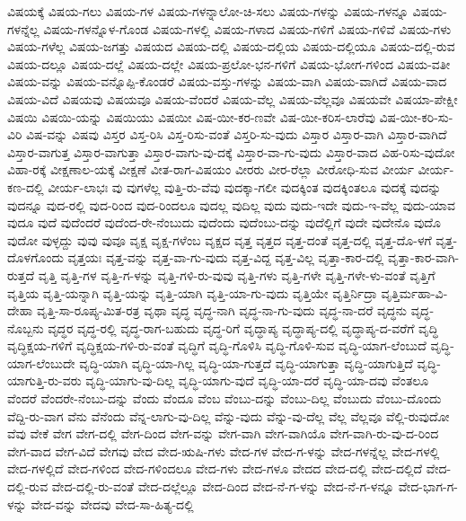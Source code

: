 {ವಿಷಯಕ್ಕೆ
ವಿಷಯ-ಗಲು
ವಿಷಯ-ಗಳ
ವಿಷಯ-ಗಳನ್ನಾಲೋ-ಚಿ-ಸಲು
ವಿಷಯ-ಗಳನ್ನು
ವಿಷಯ-ಗಳನ್ನೂ
ವಿಷಯ-ಗಳನ್ನೆಲ್ಲ
ವಿಷಯ-ಗಳನ್ನೊಳ-ಗೊಂಡ
ವಿಷಯ-ಗಳಲ್ಲಿ
ವಿಷಯ-ಗಳಾದ
ವಿಷಯ-ಗಳಿಗೆ
ವಿಷಯ-ಗಳಿವೆ
ವಿಷಯ-ಗಳು
ವಿಷಯ-ಗಳೆಲ್ಲ
ವಿಷಯ-ಜಗತ್ತು
ವಿಷಯದ
ವಿಷಯ-ದಲ್ಲಿ
ವಿಷಯ-ದಲ್ಲಿಯ
ವಿಷಯ-ದಲ್ಲಿಯೂ
ವಿಷಯ-ದಲ್ಲಿ-ರುವ
ವಿಷಯ-ದಲ್ಲೂ
ವಿಷಯ-ದಲ್ಲೆ
ವಿಷಯ-ದಲ್ಲೇ
ವಿಷಯ-ಪ್ರಲೋ-ಭನ-ಗಳಿಗೆ
ವಿಷಯ-ಭೋಗ-ಗಳಿಂದ
ವಿಷಯ-ವತೀ
ವಿಷಯ-ವನ್ನು
ವಿಷಯ-ವನ್ನೊಪ್ಪಿ-ಕೊಂಡರೆ
ವಿಷಯ-ವಸ್ತು-ಗಳನ್ನು
ವಿಷಯ-ವಾಗಿ
ವಿಷಯ-ವಾಗಿದೆ
ವಿಷಯ-ವಾದ
ವಿಷಯ-ವಿದೆ
ವಿಷಯವು
ವಿಷಯವೂ
ವಿಷಯ-ವೆಂದರೆ
ವಿಷಯ-ವೆಲ್ಲ
ವಿಷಯ-ವೆಲ್ಲವೂ
ವಿಷಯವೇ
ವಿಷಯಾ-ಪೇಕ್ಷೀ
ವಿಷಯಿ
ವಿಷಯಿ-ಯನ್ನು
ವಿಷಯಿಯು
ವಿಷಯೀ
ವಿಷ-ಯೀ-ಕರ-ಣವೇ
ವಿಷ-ಯೀ-ಕರಿಸ-ಲಾರೆವು
ವಿಷ-ಯೀ-ಕರಿ-ಸು-ವಿರಿ
ವಿಷ-ವನ್ನು
ವಿಷವು
ವಿಸ್ತರ
ವಿಸ್ತ-ರಿಸಿ
ವಿಸ್ತ-ರಿಸು-ವಂತೆ
ವಿಸ್ತರಿ-ಸು-ವುದು
ವಿಸ್ತಾರ
ವಿಸ್ತಾರ-ವಾಗಿ
ವಿಸ್ತಾರ-ವಾಗಿದೆ
ವಿಸ್ತಾರ-ವಾಗುತ್ತ
ವಿಸ್ತಾರ-ವಾಗುತ್ತಾ
ವಿಸ್ತಾರ-ವಾಗು-ವು-ದಕ್ಕೆ
ವಿಸ್ತಾರ-ವಾ-ಗು-ವುದು
ವಿಸ್ತಾರ-ವಾದ
ವಿಹ-ರಿಸು-ವುದೋ
ವಿಹಾ-ರಕ್ಕೆ
ವೀಕ್ಷಣಾಲ-ಯಕ್ಕೆ
ವೀಕ್ಷಣೆ
ವೀತ-ರಾಗ-ವಿಷಯಂ
ವೀರರು
ವೀರ-ರೆಲ್ಲಾ
ವೀರೋಧಿ-ಸುವ
ವೀರ್ಯ
ವೀರ್ಯ-ಕಣ-ದಲ್ಲಿ
ವೀರ್ಯ-ಲಾಭಃ
ವು
ವುಗಳೆಲ್ಲ
ವುತ್ತಿ-ರು-ವೆವು
ವುದಕ್ಕಾ-ಗಲೀ
ವುದಕ್ಕಿಂತ
ವುದಕ್ಕಿಂತಲೂ
ವುದಕ್ಕೆ
ವುದನ್ನು
ವುದನ್ನೂ
ವುದ-ರಲ್ಲಿ
ವುದ-ರಿಂದ
ವುದ-ರಿಂದಲೂ
ವುದಲ್ಲ
ವುದಿಲ್ಲ
ವುದು
ವುದು-ಇದೇ
ವುದು-ಇ-ವೆಲ್ಲ
ವುದು-ಯಾವ
ವುದೂ
ವುದೆ
ವುದೆಂದರೆ
ವುದೆಂದ-ರೇ-ನೆಂಬುದು
ವುದೆಂದು
ವುದೆಂಬು-ದನ್ನು
ವುದೆಲ್ಲಿಗೆ
ವುದೇ
ವುದೇನೊ
ವುದೊ
ವುದೋ
ವುಳ್ಳದ್ದು
ವುವು
ವುವೂ
ವೃಕ್ಷ
ವೃಕ್ಷ-ಗಳೆಂಬ
ವೃಕ್ಷದ
ವೃತ್ತ
ವೃತ್ತದ
ವೃತ್ತ-ದಂತೆ
ವೃತ್ತ-ದಲ್ಲಿ
ವೃತ್ತ-ದೊ-ಳಗೆ
ವೃತ್ತ-ದೊಳಗೊಂದು
ವೃತ್ತಯಃ
ವೃತ್ತ-ವನ್ನು
ವೃತ್ತ-ವಾ-ಗು-ವುದು
ವೃತ್ತ-ವಿದ್ದ
ವೃತ್ತ-ವಿಲ್ಲ
ವೃತ್ತಾ-ಕಾರ-ದಲ್ಲಿ
ವೃತ್ತಾ-ಕಾರ-ವಾಗಿ-ರುತ್ತದೆ
ವೃತ್ತಿ
ವೃತ್ತಿ-ಗಳ
ವೃತ್ತಿ-ಗ-ಳನ್ನು
ವೃತ್ತಿ-ಗಳಿ-ರು-ವುವು
ವೃತ್ತಿ-ಗಳು
ವೃತ್ತಿ-ಗಳೇ
ವೃತ್ತಿ-ಗಳೇ-ಳು-ವಂತೆ
ವೃತ್ತಿಗೆ
ವೃತ್ತಿಯ
ವೃತ್ತಿ-ಯನ್ನಾಗಿ
ವೃತ್ತಿ-ಯನ್ನು
ವೃತ್ತಿ-ಯಾಗಿ
ವೃತ್ತಿ-ಯಾ-ಗು-ವುದು
ವೃತ್ತಿಯೇ
ವೃತ್ತಿರ್ನಿದ್ರಾ
ವೃತ್ತಿರ್ಮಹಾ-ವಿ-ದೇಹಾ
ವೃತ್ತಿ-ಸಾ-ರೂಪ್ಯ-ಮಿತ-ರತ್ರ
ವೃಥಾ
ವೃದ್ಧ
ವೃದ್ಧ-ನಾಗಿ
ವೃದ್ಧ-ನಾ-ಗು-ವುದು
ವೃದ್ಧ-ನಾ-ದರೆ
ವೃದ್ಧನು
ವೃದ್ಧ-ನೊಬ್ಬನು
ವೃದ್ಧರ
ವೃದ್ಧ-ರಲ್ಲಿ
ವೃದ್ಧ-ರಾಗ-ಬಹುದು
ವೃದ್ಧ-ರಿಗೆ
ವೃದ್ಧಾಪ್ಯ
ವೃದ್ಧಾಪ್ಯ-ದಲ್ಲಿ
ವೃದ್ಧಾಪ್ಯ-ದ-ವರೆಗೆ
ವೃದ್ಧಿ
ವೃದ್ಧಿಕ್ಷಯ-ಗಳಿಗೆ
ವೃದ್ಧಿಕ್ಷಯ-ಗಳಿ-ರು-ವಂತೆ
ವೃದ್ಧಿಗೆ
ವೃದ್ಧಿ-ಗೊಳಿಸಿ
ವೃದ್ಧಿ-ಗೊಳಿ-ಸುವ
ವೃದ್ಧಿ-ಯಾಗ-ಲೆಂಬುದೆ
ವೃದ್ಧಿ-ಯಾಗ-ಲೆಂಬುದೇ
ವೃದ್ಧಿ-ಯಾಗಿ
ವೃದ್ಧಿ-ಯಾ-ಗಿಲ್ಲ
ವೃದ್ಧಿ-ಯಾ-ಗುತ್ತದೆ
ವೃದ್ಧಿ-ಯಾಗುತ್ತಾ
ವೃದ್ಧಿ-ಯಾಗುತ್ತಿದೆ
ವೃದ್ಧಿ-ಯಾಗುತ್ತಿ-ರು-ವರು
ವೃದ್ಧಿ-ಯಾಗು-ವು-ದಿಲ್ಲ
ವೃದ್ಧಿ-ಯಾಗು-ವುದೆ
ವೃದ್ಧಿ-ಯಾ-ದರೆ
ವೃದ್ಧಿ-ಯಾ-ದವು
ವೆಂತಲೂ
ವೆಂದರೆ
ವೆಂದರೇ-ನೆಂಬು-ದನ್ನು
ವೆಂದು
ವೆಂದೂ
ವೆಂಬ
ವೆಂಬು-ದನ್ನು
ವೆಂಬು-ದಿಲ್ಲ
ವೆಂಬುದು
ವೆಂಬು-ದೊಂದು
ವೆದ್ದಿ-ರು-ವಾಗ
ವೆನು
ವೆನೆಂದು
ವೆನ್ನ-ಲಾಗು-ವು-ದಿಲ್ಲ
ವೆನ್ನು-ವುದು
ವೆನ್ನು-ವು-ದೆಲ್ಲ
ವೆಲ್ಲ
ವೆಲ್ಲವೂ
ವೆಲ್ಲಿ-ರುವುದೋ
ವೆವು
ವೇಕೆ
ವೇಗ
ವೇಗ-ದಲ್ಲಿ
ವೇಗ-ದಿಂದ
ವೇಗ-ವನ್ನು
ವೇಗ-ವಾಗಿ
ವೇಗ-ವಾಗಿಯೊ
ವೇಗ-ವಾಗಿ-ರು-ವು-ದ-ರಿಂದ
ವೇಗ-ವಾದ
ವೇಗ-ವಿದೆ
ವೇಗವು
ವೇದ
ವೇದ-ಋಷಿ-ಗಳು
ವೇದ-ಗಳ
ವೇದ-ಗ-ಳನ್ನು
ವೇದ-ಗಳನ್ನೆಲ್ಲ
ವೇದ-ಗಳಲ್ಲಿ
ವೇದ-ಗಳಲ್ಲಿದೆ
ವೇದ-ಗಳಿಂದ
ವೇದ-ಗಳಿಂದಲೂ
ವೇದ-ಗಳು
ವೇದ-ಗಳೂ
ವೇದದ
ವೇದ-ದಲ್ಲಿ
ವೇದ-ದಲ್ಲಿದೆ
ವೇದ-ದಲ್ಲಿ-ರುವ
ವೇದ-ದಲ್ಲಿ-ರು-ವಂತೆ
ವೇದ-ದಲ್ಲೆಲ್ಲೂ
ವೇದ-ದಿಂದ
ವೇದ-ನೆ-ಗ-ಳನ್ನು
ವೇದ-ನೆ-ಗ-ಳನ್ನೂ
ವೇದ-ಭಾಗ-ಗ-ಳನ್ನು
ವೇದ-ವನ್ನು
ವೇದವು
ವೇದ-ಸಾ-ಹಿತ್ಯ-ದಲ್ಲಿ
}
